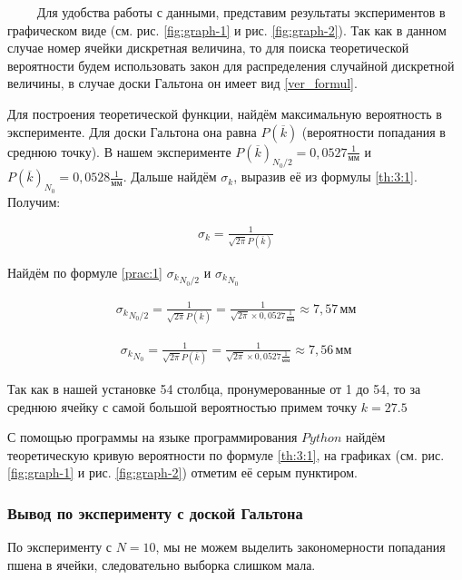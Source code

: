 $\qquad$ Для удобства работы с данными, представим результаты экспериментов в графическом виде (см. рис. \ref{fig:graph-1} и рис. \ref{fig:graph-2}). Так как в данном случае номер ячейки дискретная величина, то для поиска теоретической вероятности будем использовать закон для распределения случайной дискретной величины, в случае доски Гальтона он имеет вид \eqref{ver_formul}.

Для построения теоретической функции, найдём максимальную вероятность в эксперименте. Для доски Гальтона она равна $P(\overline{k})$ (вероятности попадания в среднюю точку). В нашем эксперименте $P(\overline{k})_{N_0/2} = 0,0527 \frac{1}{\text{мм}}$ и $P(\overline{k})_{N_0} = 0,0528 \frac{1}{\text{мм}}$. Дальше найдём $\sigma_k$, выразив её из формулы \eqref{th:3:1}. Получим:

\begin{align} \label{prac:1}
	\sigma_k = \frac{1}{\sqrt{2 \pi} P(\overline{k})} 
\end{align}

Найдём по формуле \eqref{prac:1} ${\sigma_k}_{N_0/2}$ и ${\sigma_k}_{N_0}$ 

\begin{align*}
	{\sigma_k}_{N_0/2} = \frac{1}{\sqrt{2 \pi} P(\overline{k})} = \frac{1}{\sqrt{2 \pi} \times 0,0527 \frac{1}{\text{мм}}} \approx 7,57 \, \text{мм}
\end{align*}

\begin{align*}
	{\sigma_k}_{N_0} = \frac{1}{\sqrt{2 \pi} P(\overline{k})} = \frac{1}{\sqrt{2 \pi} \times 0,0527 \frac{1}{\text{мм}}} \approx 7,56 \, \text{мм}
\end{align*}

Так как в нашей установке 54 столбца, пронумерованные от 1 до 54, то за среднюю ячейку с самой большой вероятностью примем точку $k = 27.5$ 

С помощью программы на языке программирования $Python$ найдём теоретическую кривую вероятности по формуле \eqref{th:3:1}, на графиках (см. рис. \ref{fig:graph-1} и рис. \ref{fig:graph-2}) отметим её серым пунктиром.

\subsubsection{Вывод по эксперименту с доской Гальтона}

По эксперименту с $N = 10$, мы не можем выделить закономерности попадания пшена в ячейки, следовательно выборка слишком мала. 

